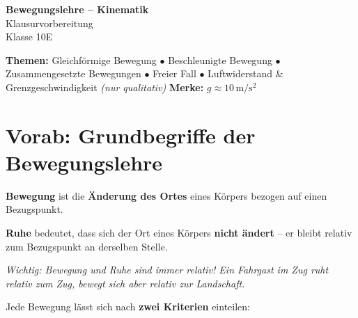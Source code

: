 \documentclass[11pt,a4paper]{article}
\begin{document}
\begin{center}
{\Huge\bfseries\color{physikblue} Bewegungslehre -- Kinematik}\\[0.3cm]
{\large Klausurvorbereitung}\\[0.2cm]
{\large Klasse 10E}
\end{center}

\vspace{0.5cm}

\begin{tcolorbox}[colback=lightblue, colframe=physikblue, boxrule=1pt]
\textbf{Themen:} Gleichförmige Bewegung $\bullet$ Beschleunigte Bewegung $\bullet$ Zusammengesetzte Bewegungen $\bullet$ Freier Fall $\bullet$ Luftwiderstand \& Grenzgeschwindigkeit \textit{(nur qualitativ)}
\hfill \textbf{Merke:} $g \approx 10\,\mathrm{m/s^2}$
\end{tcolorbox}

\vspace{0.3cm}
\tableofcontents
\newpage

\section*{Vorab: Grundbegriffe der Bewegungslehre}

\begin{merksatz}
\textbf{Bewegung} ist die \textbf{Änderung des Ortes} eines Körpers bezogen auf einen Bezugspunkt.

\textbf{Ruhe} bedeutet, dass sich der Ort eines Körpers \textbf{nicht ändert} -- er bleibt relativ zum Bezugspunkt an derselben Stelle.

\textit{Wichtig: Bewegung und Ruhe sind immer relativ! Ein Fahrgast im Zug ruht relativ zum Zug, bewegt sich aber relativ zur Landschaft.}
\end{merksatz}

\vspace{0.5cm}
Jede Bewegung lässt sich nach \textbf{zwei Kriterien} einteilen:

\vspace{0.5cm}
\end{document}
